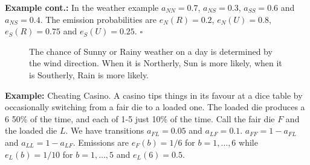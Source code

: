 \documentclass[11pt]{article}
\newcommand{\sqend}{\hfill $\square$}
\begin{document}
{\bf Example cont.:} In the weather example $a_{NN} = 0.7$, $a_{NS} = 0.3$, $a_{SS} = 0.6$ and $a_{NS} = 0.4$.  The emission probabilities are $e_N(R) = 0.2$, $e_N(U) = 0.8$, $e_S(R) = 0.75$ and $e_S(U) = 0.25$. \sqend

\begin{figure}[htbp]
\begin{center}
\end{center}
\caption{The chance of Sunny or Rainy weather on a day is determined by the wind direction.  When it is Northerly, Sun is more likely, when it is Southerly, Rain is more likely. }
\end{figure}


{\bf Example:} Cheating Casino.  A casino tips things in its favour at a dice table by occasionally switching from a fair die to a loaded one.  The loaded die produces a 6 50\% of the time, and each of 1-5 just 10\% of the time.  Call the fair die $F$ and the loaded die $L$.  We have transitions $a_{FL} = 0.05$ and $a_{LF} = 0.1$.  $a_{FF} = 1 - a_{FL}$ and $a_{LL} = 1 - a_{LF}$.  Emissions are $e_F(b) = 1/6$ for $b = 1,\ldots,6$ while $e_L(b) = 1/10$ for $b = 1,\ldots,5$ and $e_L(6 ) = 0.5$.
\end{document}
